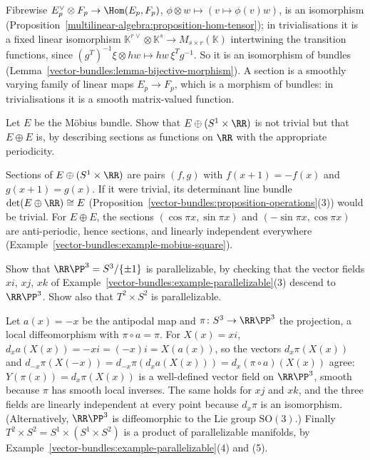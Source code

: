 \begin{solution}
Fibrewise $E_p^\vee \otimes F_p \to \Hom(E_p, F_p)$, $\phi \otimes w \mapsto (v \mapsto \phi(v)w)$, is an isomorphism (Proposition~\ref{multilinear-algebra:proposition-hom-tensor}); in trivialisations
it is a fixed linear isomorphism $\mathbb{K}^{r\vee} \otimes \mathbb{K}^s \to M_{s \times r}(\mathbb{K})$ intertwining the transition functions, since $(g^T)^{-1}\xi \otimes hw \mapsto hw\,\xi^Tg^{-1}$. So
it is an isomorphism of bundles (Lemma~\ref{vector-bundles:lemma-bijective-morphism}). A section is a smoothly varying family of linear maps $E_p \to F_p$, which is a morphism of bundles:
in trivialisations it is a smooth matrix-valued function.
\end{solution}

\begin{exercise}\label{vector-bundles:exercise-sum-mobius-explicit}
Let $E$ be the M\"obius bundle. Show that $E \oplus (S^1 \times \RR)$ is not trivial but that $E \oplus E$ is, by describing sections as functions on $\RR$ with the appropriate periodicity.
\end{exercise}

\begin{solution}
Sections of $E \oplus (S^1 \times \RR)$ are pairs $(f, g)$ with $f(x + 1) = -f(x)$ and $g(x + 1) = g(x)$. If it were trivial, its determinant line bundle $\det(E \oplus \RR) \cong E$
(Proposition~\ref{vector-bundles:proposition-operations}(3)) would be trivial. For $E \oplus E$, the sections $(\cos\pi x, \sin\pi x)$ and $(-\sin\pi x, \cos\pi x)$ are anti-periodic, hence
sections, and linearly independent everywhere (Example~\ref{vector-bundles:example-mobius-square}).
\end{solution}

\begin{exercise}\label{vector-bundles:exercise-rp3-parallelizable}
Show that $\RR\PP^3 = S^3/\{\pm1\}$ is parallelizable, by checking that the vector fields $xi$, $xj$, $xk$ of Example~\ref{vector-bundles:example-parallelizable}(3) descend to $\RR\PP^3$. Show also that
$T^2 \times S^2$ is parallelizable.
\end{exercise}

\begin{solution}
Let $a(x) = -x$ be the antipodal map and $\pi \colon S^3 \to \RR\PP^3$ the projection, a local diffeomorphism with $\pi \circ a = \pi$. For $X(x) = xi$, $d_xa(X(x)) = -xi = (-x)i = X(a(x))$, so the vectors
$d_x\pi(X(x))$ and $d_{-x}\pi(X(-x)) = d_{-x}\pi(d_xa(X(x))) = d_x(\pi \circ a)(X(x))$ agree: $Y(\pi(x)) = d_x\pi(X(x))$ is a well-defined vector field on $\RR\PP^3$, smooth because $\pi$ has smooth local inverses. The
same holds for $xj$ and $xk$, and the three fields are linearly independent at every point because $d_x\pi$ is an isomorphism. (Alternatively, $\RR\PP^3$ is diffeomorphic to the Lie group $\mathrm{SO}(3)$.)
Finally $T^2 \times S^2 = S^1 \times (S^1 \times S^2)$ is a product of parallelizable manifolds, by Example~\ref{vector-bundles:example-parallelizable}(4) and (5).
\end{solution}
